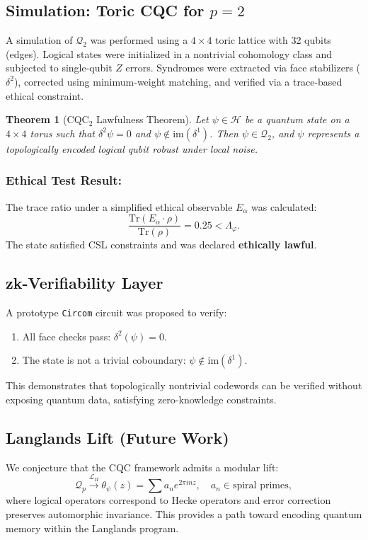 \documentclass[12]{amsart}
\theoremstyle{plain}
\newtheorem{theorem}{Theorem}[section]
\begin{document}
\subsection{Simulation: Toric CQC for $p=2$}
A simulation of $\mathcal{Q}_2$ was performed using a $4 \times 4$ toric lattice with 32 qubits (edges). Logical states were initialized in a nontrivial cohomology class and subjected to single-qubit $Z$ errors. Syndromes were extracted via face stabilizers ($\delta^2$), corrected using minimum-weight matching, and verified via a trace-based ethical constraint.

\begin{theorem}[CQC$_2$ Lawfulness Theorem]
Let $\psi \in \mathcal{H}$ be a quantum state on a $4 \times 4$ torus such that $\delta^2 \psi = 0$ and $\psi \notin \mathrm{im}(\delta^1)$. Then $\psi \in \mathcal{Q}_2$, and $\psi$ represents a topologically encoded logical qubit robust under local noise.
\end{theorem}

\subsubsection*{Ethical Test Result:}
The trace ratio under a simplified ethical observable $E_\alpha$ was calculated:
\[
\frac{\mathrm{Tr}(E_\alpha \cdot \rho)}{\mathrm{Tr}(\rho)} = 0.25 < \Lambda_\varphi.
\]
The state satisfied CSL constraints and was declared \textbf{ethically lawful}.

\subsection{zk-Verifiability Layer}
A prototype \texttt{Circom} circuit was proposed to verify:
\begin{enumerate}
    \item All face checks pass: $\delta^2(\psi) = 0$.
    \item The state is not a trivial coboundary: $\psi \notin \mathrm{im}(\delta^1)$.
\end{enumerate}
This demonstrates that topologically nontrivial codewords can be verified without exposing quantum data, satisfying zero-knowledge constraints.

\subsection{Langlands Lift (Future Work)}
We conjecture that the CQC framework admits a modular lift:
\[
\mathcal{Q}_p \xrightarrow{\mathcal{L}_\Pi} \theta_\psi(z) = \sum a_n e^{2\pi i n z}, \quad a_n \in \text{spiral primes},
\]
where logical operators correspond to Hecke operators and error correction preserves automorphic invariance. This provides a path toward encoding quantum memory within the Langlands program.
\end{document}
